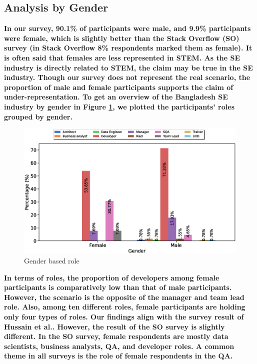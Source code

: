 \subsection{Analysis by Gender}
\label{analysis by gender}

\bf{In our survey, 90.1\% of participants were male, and 9.9\% participants were
female, which is slightly better than the Stack Overflow (SO) survey
\citep{StackoverflowSurvey2017,StackoverflowSurvey2018,StackoverflowSurvey2019,StackoverflowSurvey2020}
(in Stack Overflow 8\% respondents marked them as female).} It is often said that
females are less represented in STEM. As the SE industry is directly related to
STEM, the claim may be true in the SE industry. Though our survey does not
represent the real scenario, the proportion of male and female participants
supports the claim of under-representation. To get an overview of the Bangladesh
SE industry by gender in Figure \ref{fig:gender and role}, we plotted the
participants' roles grouped by gender.
\begin{figure}[h] \centering
 \includegraphics[scale=0.3]{Figures/Gender_and_Role}
 \caption{Gender based role}
 \label{fig:gender and role}
\end{figure}
\bf{In terms of roles, the proportion of developers among female participants is
comparatively low than that of male participants. However, the scenario is the
opposite of the manager and team lead role.} \bf{Also, among ten different roles, female participants are holding only four types of roles. Our findings align with the survey result of Hussain et
al.\citep{Hussain2020}. However,  the result of the SO survey\citep{StackoverflowSurvey2020} is slightly different. In the SO survey, female respondents are mostly data scientists, business analysts, QA, and developer roles. A common theme in all surveys is the role of female
respondents in the QA.}

